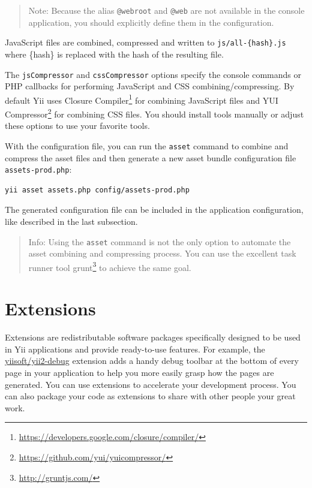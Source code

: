 \begin{quote}Note: Because the alias \lstinline|@webroot| and \lstinline|@web| are not available in the console application, you should
  explicitly define them in the configuration.

\end{quote}
JavaScript files are combined, compressed and written to \lstinline|js/all-{hash}.js| where \{hash\} is replaced with the hash of
the resulting file.

The \lstinline|jsCompressor| and \lstinline|cssCompressor| options specify the console commands or PHP callbacks for performing
JavaScript and CSS combining/compressing. By default Yii uses Closure Compiler\footnote{\url{https://developers.google.com/closure/compiler/}} 
for combining JavaScript files and YUI Compressor\footnote{\url{https://github.com/yui/yuicompressor/}} for combining CSS files. 
You should install tools manually or adjust these options to use your favorite tools.

With the configuration file, you can run the \lstinline|asset| command to combine and compress the asset files
and then generate a new asset bundle configuration file \lstinline|assets-prod.php|:

\begin{lstlisting}
yii asset assets.php config/assets-prod.php
\end{lstlisting}
The generated configuration file can be included in the application configuration, like described in
the last subsection.

\begin{quote}Info: Using the \lstinline|asset| command is not the only option to automate the asset combining and compressing process.
  You can use the excellent task runner tool grunt\footnote{\url{http://gruntjs.com/}} to achieve the same goal.

\end{quote}


\label{structure-extensions.md}\section{Extensions}
Extensions are redistributable software packages specifically designed to be used in Yii applications and provide
ready-to-use features. For example, the \hyperref[tool-debugger.md]{yiisoft/yii2-debug} extension adds a handy debug toolbar
at the bottom of every page in your application to help you more easily grasp how the pages are generated. You can
use extensions to accelerate your development process. You can also package your code as extensions to share with
other people your great work.

